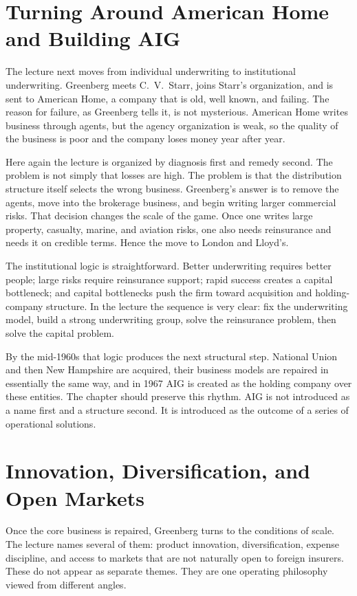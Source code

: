 \section{Turning Around American Home and Building AIG}

The lecture next moves from individual underwriting to institutional underwriting. Greenberg meets C.\ V.\ Starr, joins Starr's organization, and is sent to American Home, a company that is old, well known, and failing. The reason for failure, as Greenberg tells it, is not mysterious. American Home writes business through agents, but the agency organization is weak, so the quality of the business is poor and the company loses money year after year.

Here again the lecture is organized by diagnosis first and remedy second. The problem is not simply that losses are high. The problem is that the distribution structure itself selects the wrong business. Greenberg's answer is to remove the agents, move into the brokerage business, and begin writing larger commercial risks. That decision changes the scale of the game. Once one writes large property, casualty, marine, and aviation risks, one also needs reinsurance and needs it on credible terms. Hence the move to London and Lloyd's.

The institutional logic is straightforward. Better underwriting requires better people; large risks require reinsurance support; rapid success creates a capital bottleneck; and capital bottlenecks push the firm toward acquisition and holding-company structure. In the lecture the sequence is very clear: fix the underwriting model, build a strong underwriting group, solve the reinsurance problem, then solve the capital problem.

By the mid-1960s that logic produces the next structural step. National Union and then New Hampshire are acquired, their business models are repaired in essentially the same way, and in 1967 AIG is created as the holding company over these entities. The chapter should preserve this rhythm. AIG is not introduced as a name first and a structure second. It is introduced as the outcome of a series of operational solutions.

\section{Innovation, Diversification, and Open Markets}

Once the core business is repaired, Greenberg turns to the conditions of scale. The lecture names several of them: product innovation, diversification, expense discipline, and access to markets that are not naturally open to foreign insurers. These do not appear as separate themes. They are one operating philosophy viewed from different angles.

